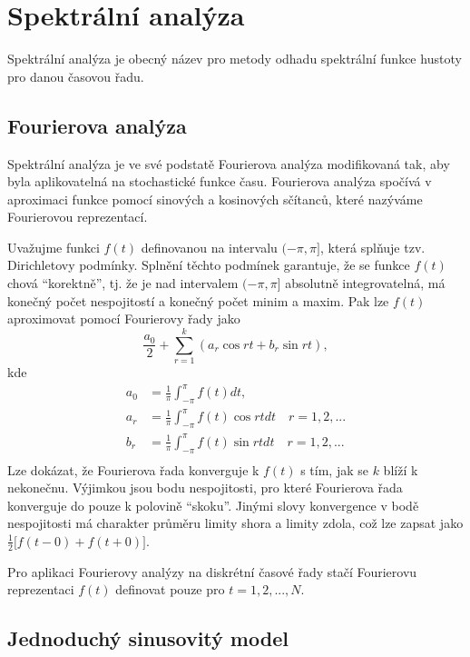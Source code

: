 \chapter{Spektrální analýza}

Spektrální analýza je obecný název pro metody odhadu spektrální funkce hustoty pro danou časovou řadu.

\section{Fourierova analýza}

Spektrální analýza je ve své podstatě Fourierova analýza modifikovaná tak, aby byla aplikovatelná na stochastické funkce času. Fourierova analýza spočívá v aproximaci funkce pomocí sinových a kosinových sčítanců, které nazýváme Fourierovou reprezentací.

Uvažujme funkci $f(t)$ definovanou na intervalu $(-\pi, \pi]$, která splňuje tzv. Dirichletovy podmínky. Splnění těchto podmínek garantuje, že se funkce $f(t)$ chová ``korektně'', tj. že je nad intervalem $(-\pi, \pi]$ absolutně integrovatelná, má konečný počet nespojitostí a konečný počet minim a maxim. Pak lze $f(t)$ aproximovat pomocí Fourierovy řady jako
\begin{equation}
\frac{a_0}{2} + \sum_{r = 1}^k (a_r \cos rt + b_r \sin rt),
\end{equation}
kde
\begin{align}
a_0 &= \frac{1}{\pi} \int_{-\pi}^{\pi} f(t)dt, \nonumber\\
a_r &= \frac{1}{\pi} \int_{-\pi}^{\pi} f(t) \cos rt dt \quad r = 1, 2, ...\\
b_r &= \frac{1}{\pi} \int_{-\pi}^{\pi} f(t) \sin rt dt \quad r = 1, 2, ... \nonumber\\
\end{align}
Lze dokázat, že Fourierova řada konverguje k $f(t)$ s tím, jak se $k$ blíží k nekonečnu. Výjimkou jsou bodu nespojitosti, pro které Fourierova řada konverguje do pouze k polovině ``skoku''. Jinými slovy konvergence v bodě nespojitosti má charakter průměru limity shora a limity zdola, což lze zapsat jako $\frac{1}{2}\Big[f(t - 0) + f(t + 0)\Big]$.

Pro aplikaci Fourierovy analýzy na diskrétní časové řady stačí Fourierovu reprezentaci $f(t)$ definovat pouze pro $t = 1, 2, ..., N$.

\section{Jednoduchý sinusovitý model}

